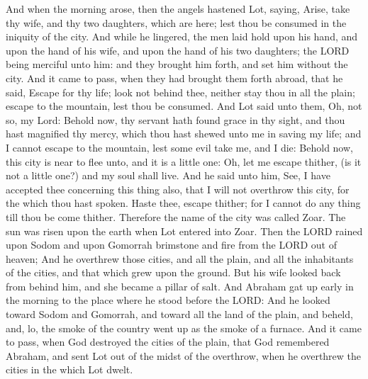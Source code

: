 \begin{biblechapter}
\verse And when the morning arose, then the angels hastened Lot, saying, Arise, take thy wife, and thy two daughters, which are here; lest thou be consumed in the iniquity of the city.
\verse And while he lingered, the men laid hold upon his hand, and upon the hand of his wife, and upon the hand of his two daughters; the LORD being merciful unto him: and they brought him forth, and set him without the city.
\verse And it came to pass, when they had brought them forth abroad, that he said, Escape for thy life; look not behind thee, neither stay thou in all the plain; escape to the mountain, lest thou be consumed.
\verse And Lot said unto them, Oh, not so, my Lord:
\verse Behold now, thy servant hath found grace in thy sight, and thou hast magnified thy mercy, which thou hast shewed unto me in saving my life; and I cannot escape to the mountain, lest some evil take me, and I die:
\verse Behold now, this city is near to flee unto, and it is a little one: Oh, let me escape thither, (is it not a little one?) and my soul shall live.
\verse And he said unto him, See, I have accepted thee concerning this thing also, that I will not overthrow this city, for the which thou hast spoken.
\verse Haste thee, escape thither; for I cannot do any thing till thou be come thither. Therefore the name of the city was called Zoar.
\verse The sun was risen upon the earth when Lot entered into Zoar.
\verse Then the LORD rained upon Sodom and upon Gomorrah brimstone and fire from the LORD out of heaven;
\verse And he overthrew those cities, and all the plain, and all the inhabitants of the cities, and that which grew upon the ground.
\verse But his wife looked back from behind him, and she became a pillar of salt.
\verse And Abraham gat up early in the morning to the place where he stood before the LORD:
\verse And he looked toward Sodom and Gomorrah, and toward all the land of the plain, and beheld, and, lo, the smoke of the country went up as the smoke of a furnace.
\verse And it came to pass, when God destroyed the cities of the plain, that God remembered Abraham, and sent Lot out of the midst of the overthrow, when he overthrew the cities in the which Lot dwelt.

\end{biblechapter}
